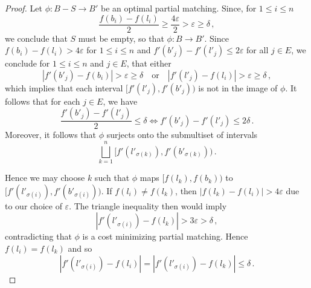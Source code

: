 \documentclass{article}
\theoremstyle{definition}
\renewcommand{\epsilon}{\varepsilon}
\begin{document}
\begin{proof}
    Let $\phi:B-S \to B'$ be an optimal partial matching. Since, for $1\leq i \leq n$
    \begin{equation*}
        \frac{f(b_i) - f(l_i)}{2} \geq \frac{4\epsilon}{2} > \epsilon \geq \delta\,,
    \end{equation*}
    we conclude that $S$ must be empty, so that $\phi:B \to B'$. Since $f(b_i) - f(l_i) > 4\epsilon$ for $1 \leq i \leq n$ and $f'(b'_j) - f'(l'_j) \leq 2 \epsilon$ for all $j \in E$, we conclude for $1 \leq i \leq n$ and $j \in E$, that either
    \begin{equation*}
        |f'(b'_j) - f(b_i)| > \epsilon \geq \delta \quad \text{or} \quad |f'(l'_j) - f(l_i)| > \epsilon \geq \delta\,,
    \end{equation*}
    which implies that each interval $\big[f'(l'_j), f'(b'_j)\big)$ is not in the image of $\phi$. It follows that for each $j \in E$, we have
    \begin{equation*}
        \frac{f'(b'_j) - f'(l'_j)}{2} \leq \delta \iff f'(b'_j) - f'(l'_j) \leq 2\delta\,.
    \end{equation*}
    Moreover, it follows that $\phi$ surjects onto the submultiset of intervals
    \begin{equation*}
        \bigsqcup_{k = 1}^n\big[f'(l'_{\sigma(k)}), f'(b'_{\sigma(k)})\big)\,.
    \end{equation*}

    Hence we may choose $k$ such that $\phi$ maps $\big[f(l_k), f(b_k)\big)$ to $\big[f'(l'_{\sigma(i)}), f'(b'_{\sigma(i)})\big)$. If $f(l_i) \neq f(l_k)$, then $|f(l_k) - f(l_i)| > 4\epsilon$ due to our choice of $\epsilon$. The triangle inequality then would imply
    \begin{equation*}
        |f'(l'_{\sigma(i)}) - f(l_k)| > 3\epsilon > \delta\,,
    \end{equation*}
    contradicting that $\phi$ is a cost minimizing partial matching. Hence $f(l_i) = f(l_k)$ and so
    \begin{equation*}
        |f'(l'_{\sigma(i)}) - f(l_i)| =|f'(l'_{\sigma(i)}) - f(l_k)| \leq \delta\,.
    \end{equation*}


\end{proof}
\end{document}
